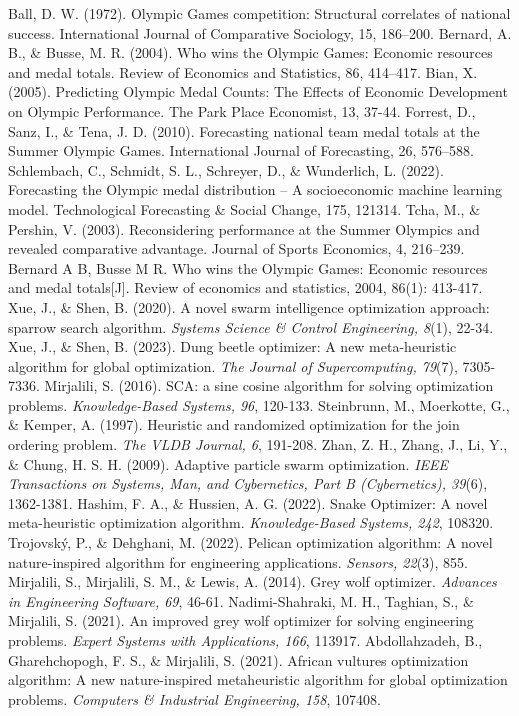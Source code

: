 \documentclass{mcmthesis}
\begin{document}
\begin{thebibliography}{99}
     Ball, D. W. (1972). Olympic Games competition: Structural correlates of national success. International Journal of Comparative Sociology, 15, 186–200.
     Bernard, A. B., \& Busse, M. R. (2004). Who wins the Olympic Games: Economic resources and medal totals. Review of Economics and Statistics, 86, 414–417.
     Bian, X. (2005). Predicting Olympic Medal Counts: The Effects of Economic Development on Olympic Performance. The Park Place Economist, 13, 37-44.
     Forrest, D., Sanz, I., \& Tena, J. D. (2010). Forecasting national team medal totals at the Summer Olympic Games. International Journal of Forecasting, 26, 576–588.
     Schlembach, C., Schmidt, S. L., Schreyer, D., \& Wunderlich, L. (2022). Forecasting the Olympic medal distribution – A socioeconomic machine learning model. Technological Forecasting \& Social Change, 175, 121314.
     Tcha, M., \& Pershin, V. (2003). Reconsidering performance at the Summer Olympics and revealed comparative advantage. Journal of Sports Economics, 4, 216–239.
     Bernard A B, Busse M R. Who wins the Olympic Games: Economic resources and medal totals[J]. Review of economics and statistics, 2004, 86(1): 413-417.
     Xue, J., \& Shen, B. (2020). A novel swarm intelligence optimization approach: sparrow search algorithm. \textit{Systems Science \& Control Engineering, 8}(1), 22-34.
     Xue, J., \& Shen, B. (2023). Dung beetle optimizer: A new meta-heuristic algorithm for global optimization. \textit{The Journal of Supercomputing, 79}(7), 7305-7336.
     Mirjalili, S. (2016). SCA: a sine cosine algorithm for solving optimization problems. \textit{Knowledge-Based Systems, 96}, 120-133.
     Steinbrunn, M., Moerkotte, G., \& Kemper, A. (1997). Heuristic and randomized optimization for the join ordering problem. \textit{The VLDB Journal, 6}, 191-208.
     Zhan, Z. H., Zhang, J., Li, Y., \& Chung, H. S. H. (2009). Adaptive particle swarm optimization. \textit{IEEE Transactions on Systems, Man, and Cybernetics, Part B (Cybernetics), 39}(6), 1362-1381.
     Hashim, F. A., \& Hussien, A. G. (2022). Snake Optimizer: A novel meta-heuristic optimization algorithm. \textit{Knowledge-Based Systems, 242}, 108320.
     Trojovský, P., \& Dehghani, M. (2022). Pelican optimization algorithm: A novel nature-inspired algorithm for engineering applications. \textit{Sensors, 22}(3), 855.
     Mirjalili, S., Mirjalili, S. M., \& Lewis, A. (2014). Grey wolf optimizer. \textit{Advances in Engineering Software, 69}, 46-61.
     Nadimi-Shahraki, M. H., Taghian, S., \& Mirjalili, S. (2021). An improved grey wolf optimizer for solving engineering problems. \textit{Expert Systems with Applications, 166}, 113917.
     Abdollahzadeh, B., Gharehchopogh, F. S., \& Mirjalili, S. (2021). African vultures optimization algorithm: A new nature-inspired metaheuristic algorithm for global optimization problems. \textit{Computers \& Industrial Engineering, 158}, 107408.


\end{thebibliography}
\end{document}
